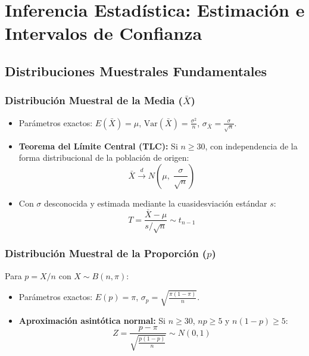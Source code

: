 \documentclass[11pt,a4paper]{report}
\theoremstyle{definition}
\begin{document}
\newpage
\chapter{Inferencia Estadística: Estimación e Intervalos de Confianza}

\section{Distribuciones Muestrales Fundamentales}

\subsection{Distribución Muestral de la Media ($\bar{X}$)}
\begin{itemize}[leftmargin=*]
    \item Parámetros exactos: $E(\bar{X}) = \mu$, $\text{Var}(\bar{X}) = \frac{\sigma^2}{n}$, $\sigma_{\bar{X}} = \frac{\sigma}{\sqrt{n}}$.
    \item \textbf{Teorema del Límite Central (TLC):} Si $n \ge 30$, con independencia de la forma distribucional de la población de origen:
    \begin{equation}
    \bar{X} \xrightarrow{d} N\left(\mu, \; \frac{\sigma}{\sqrt{n}}\right)
    \end{equation}
    \item Con $\sigma$ desconocida y estimada mediante la cuasidesviación estándar $s$:
    \begin{equation}
    T = \frac{\bar{X} - \mu}{s / \sqrt{n}} \sim t_{n-1}
    \end{equation}
\end{itemize}

\subsection{Distribución Muestral de la Proporción ($p$)}
Para $p = X/n$ con $X \sim B(n, \pi)$:
\begin{itemize}[leftmargin=*]
    \item Parámetros exactos: $E(p) = \pi$, $\sigma_p = \sqrt{\frac{\pi(1-\pi)}{n}}$.
    \item \textbf{Aproximación asintótica normal:} Si $n \ge 30$, $np \ge 5$ y $n(1-p) \ge 5$:
    \begin{equation}
    Z = \frac{p - \pi}{\sqrt{\frac{p(1-p)}{n}}} \sim N(0, 1)
    \end{equation}
\end{itemize}
\end{document}
